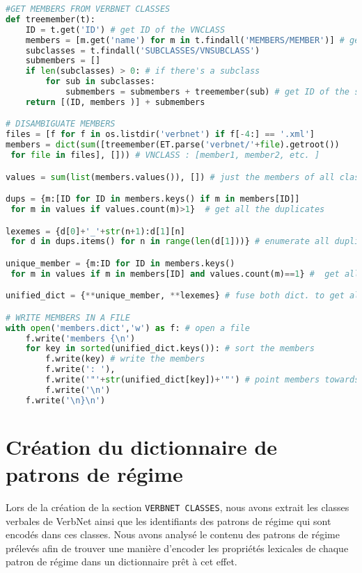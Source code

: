 \begin{lstlisting}[language=Python, caption = Ajout des membres de VerbNet, label=scriptmember]
#GET MEMBERS FROM VERBNET CLASSES
def treemember(t):
    ID = t.get('ID') # get ID of the VNCLASS
    members = [m.get('name') for m in t.findall('MEMBERS/MEMBER')] # get members 
    subclasses = t.findall('SUBCLASSES/VNSUBCLASS')
    submembers = []
    if len(subclasses) > 0: # if there's a subclass
        for sub in subclasses:
            submembers = submembers + treemember(sub) # get ID of the subclass and members
    return [(ID, members )] + submembers

# DISAMBIGUATE MEMBERS
files = [f for f in os.listdir('verbnet') if f[-4:] == '.xml']
members = dict(sum([treemember(ET.parse('verbnet/'+file).getroot())
 for file in files], [])) # VNCLASS : [member1, member2, etc. ]

values = sum(list(members.values()), []) # just the members of all classes

dups = {m:[ID for ID in members.keys() if m in members[ID]]
 for m in values if values.count(m)>1}  # get all the duplicates

lexemes = {d[0]+'_'+str(n+1):d[1][n]
 for d in dups.items() for n in range(len(d[1]))} # enumerate all duplicates: eat_1, eat_2

unique_member = {m:ID for ID in members.keys() 
 for m in values if m in members[ID] and values.count(m)==1} #  get all unique lexemes

unified_dict = {**unique_member, **lexemes} # fuse both dict. to get all members disambiguated

# WRITE MEMBERS IN A FILE
with open('members.dict','w') as f: # open a file
    f.write('members {\n')
    for key in sorted(unified_dict.keys()): # sort the members
        f.write(key) # write the members
        f.write(': '),
        f.write('"'+str(unified_dict[key])+'"') # point members towards ID of VNCLASS
        f.write('\n')
    f.write('\n}\n')
\end{lstlisting}

\section{Création du dictionnaire de patrons de régime}\label{sec:creategpcon}

Lors de la création de la section \texttt{VERBNET CLASSES}, nous avons extrait les classes verbales de VerbNet ainsi que les identifiants des patrons de régime qui sont encodés dans ces classes. Nous avons analysé le contenu des patrons de régime prélevés afin de trouver une manière d'encoder les propriétés lexicales de chaque patron de régime dans un dictionnaire prêt à cet effet.

